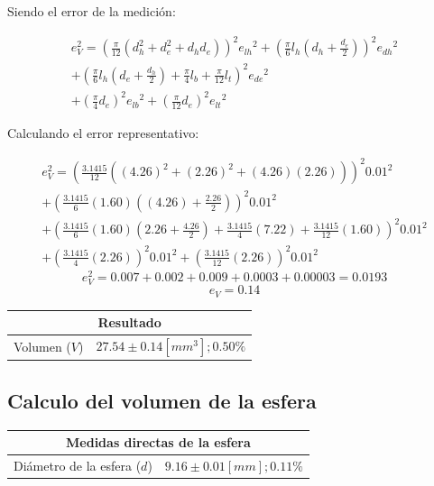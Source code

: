 \documentclass[letter,11pt]{article}
\begin{document}
Siendo el error de la medición:

\begin{equation}
\begin{split}
    e_V^2 = 
        \left(\frac{\pi}{12}(d_h^2+d_e^2+d_h d_e)\right)^2{e_{lh}}^2
        +\left(\frac{\pi}{6}l_h(d_h+\frac{d_e}{2})\right)^2{e_{dh}}^2 \\
        +\left(\frac{\pi}{6}l_h(d_e+\frac{d_h}{2})+\frac{\pi}{4}l_b
        +\frac{\pi}{12}l_t\right)^2{e_{de}}^2 \\
        +\left(\frac{\pi}{4} d_e\right)^2{e_{lb}}^2
        +\left(\frac{\pi}{12} d_e\right)^2{e_{lt}}^2
\end{split}
\end{equation}

Calculando el error representativo:

\begin{equation*}
\begin{split}
    e_V^2 = 
        \left(\frac{3.1415}{12}((4.26)^2+(2.26)^2
        +(4.26)(2.26))\right)^2 0.01^2 \\
        +\left(\frac{3.1415}{6}(1.60)((4.26)+\frac{2.26}{2})\right)^2 0.01^2 \\
        +\left(\frac{3.1415}{6}(1.60)(2.26+\frac{4.26}{2})
        +\frac{3.1415}{4}(7.22)
        +\frac{3.1415}{12}(1.60)\right)^2 0.01^2 \\
        +\left(\frac{3.1415}{4}(2.26)\right)^2 0.01^2
        +\left(\frac{3.1415}{12}(2.26)\right)^2 0.01^2
\end{split}
\end{equation*}
\begin{equation*}
    e_V^2 = 0.007+0.002+0.009+0.0003+0.00003 = 0.0193
\end{equation*}
\begin{equation*}
    e_V = 0.14
\end{equation*}

\begin{center}
\begin{tabular}{|c|>{\centering}m{5.0cm}<{\centering}|}
\hline
\multicolumn{2}{|c|}{\textbf{Resultado}}
\tabularnewline \hline
Volumen ($V$) & $27.54\pm0.14 [mm^3]; 0.50\%$ \tabularnewline \hline
\end{tabular}
\end{center}

\subsection{Calculo del volumen de la esfera}
\vspace*{0.25cm}
\begin{center}
\begin{tabular}{|c|>{\centering}m{5.0cm}<{\centering}|}
\hline
\multicolumn{2}{|c|}{\textbf{Medidas directas de la esfera}}
\tabularnewline \hline
Diámetro de la esfera ($d$) & $9.16 \pm 0.01 [mm]; 0.11\%$
\tabularnewline \hline
\end{tabular}
\end{center}
\end{document}
